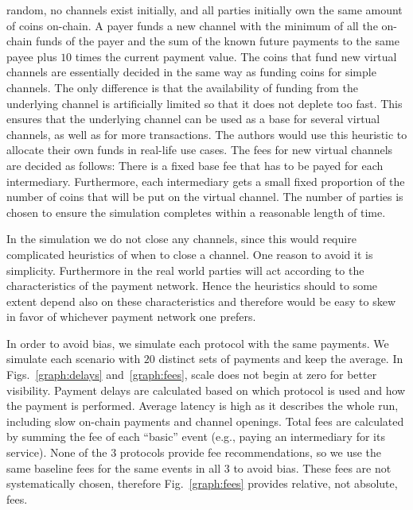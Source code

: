   random, no channels exist initially, and all parties initially own the same
  amount of coins on-chain. A payer funds a new channel with the minimum of all
  the on-chain funds of the payer and the sum of the known future payments to
  the same payee plus $10$ times the current payment value.
  The coins that fund new virtual channels are essentially decided in the same way as funding coins for simple channels. The only difference is that the availability of funding from the underlying channel is artificially limited so that it does not deplete too fast. This ensures that the underlying channel can be used as a base for several virtual channels, as well as for more transactions. The authors would use this heuristic to allocate their own funds in real-life use cases.
  The fees for new virtual channels are decided as follows: There is a fixed base fee that has to be payed for each intermediary. Furthermore, each intermediary gets a small fixed proportion of the number of coins that will be put on the virtual channel.
  The
  number of parties is chosen to ensure the simulation completes within a
  reasonable length of time.

  In the simulation we do not close any channels, since this would require
  complicated heuristics of when to close a channel. One reason to avoid it is
  simplicity. Furthermore in the real world parties will act according to the
  characteristics of the payment network. Hence the heuristics should to some
  extent depend also on these characteristics and therefore would be easy to
  skew in favor of whichever payment network one prefers.

  In order to avoid bias, we simulate each
  protocol with the same payments. We simulate each scenario with $20$
  distinct sets of payments and keep the average.
  In Figs.~\ref{graph:delays} and~\ref{graph:fees}, scale does not begin at zero
  for better visibility. Payment
  delays are calculated based on which protocol is used and how the payment is
  performed. Average
  latency is high as it describes the whole run, including slow on-chain
  payments and channel openings. Total fees are calculated by summing the fee
  of each ``basic'' event (e.g., paying an intermediary for its service). None
  of the $3$ protocols provide fee recommendations, so we use the same baseline
  fees for the same events in all $3$ to avoid bias. These
  fees are not systematically chosen, therefore Fig.~\ref{graph:fees} provides
  relative, not absolute, fees.

